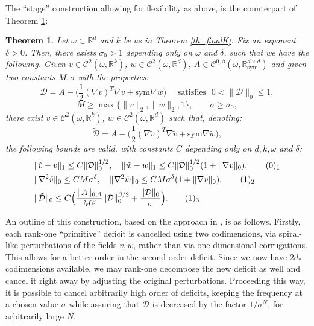 \documentclass[reqno,twoside,11pt]{amsart}
\newcommand{\sym}{\mathrm{sym}}
\newcommand{\R}{\mathbb{R}}
\numberwithin{equation}{section}
\theoremstyle{plain}
\newtheorem{theorem}{Theorem}[section]
\theoremstyle{definition}
\begin{document}
\noindent The ``stage'' construction allowing for flexibility as
above, is the counterpart of Theorem \ref{thm_stageK}:

\begin{theorem}\label{thm_stageK}
Let $\omega\subset\R^d$ and $k$ be as in Theorem \ref{th_finalK}. Fix an exponent $\delta>0$. Then,
there exists $\sigma_0>1$ depending only on $\omega$ and $\delta$,
such that we have the following. Given $v\in\mathcal{C}^2(\bar \omega,\R^k)$,
$w\in\mathcal{C}^2(\bar\omega,\R^d)$, 
$A\in\mathcal{C}^{0,\beta}(\bar\omega,\R^{d\times d}_\sym)$ and given
two constants $M, \sigma$ with the properties:
$$\mathcal{D}=A -\big(\frac{1}{2}(\nabla v)^T\nabla v + \sym\nabla
w\big) \quad \mbox{ satisfies } \; 0<\|\mathcal{D}\|_0\leq 1,$$
$$M\geq\max\{\|v\|_2, \|w\|_2, 1\}, \qquad \sigma\geq \sigma_0,$$
there exist $\tilde v\in\mathcal{C}^2(\bar \omega,\R^k)$,
$\tilde w\in\mathcal{C}^2(\bar\omega,\R^d)$ such that, denoting:
$$\tilde{\mathcal{D}}=A -\big(\frac{1}{2}(\nabla \tilde v)^T\nabla \tilde v + \sym\nabla \tilde w\big), $$
the following bounds are valid,  with constants $C$ depending only on
$d,k, \omega$ and $\delta$:
\begin{align*}
& \|\tilde v - v\|_1\leq C\|\mathcal{D}\|_0^{1/2}, \quad \|\tilde w -
w\|_1\leq C\|\mathcal{D}\|_0^{1/2}(1+\|\nabla v\|_0), \vspace{2mm}
\tag*{(\theequation)$_1$}\refstepcounter{equation} \label{Abound1K}\\
& \|\nabla^2\tilde v\|_0\leq CM\sigma^{\delta},\quad \|\nabla^2\tilde
w\|_0\leq CM\sigma^{\delta}(1+\|\nabla v\|_0), \vspace{2mm}
\tag*{(\theequation)$_2$}\label{Abound2K} \\ 
& \|\tilde{\mathcal{D}}\|_0\leq C\Big(\frac{\|A\|_{0,\beta}}{M^\beta} \|\mathcal{D}\|_0^{\beta/2} +
\frac{\|\mathcal{D}\|_0}{\sigma}\Big). \tag*{(\theequation)$_3$} \label{Abound3K}
\end{align*}
\end{theorem}

\medskip

\noindent An outline of this construction, based on the approach in \cite{Kallen}, is as follows. Firstly,
each rank-one ``primitive'' deficit is cancelled using two
codimensions, via spiral-like perturbations of the fields $v,w$,
rather than via one-dimensional corrugations. This allows for
a better order in the second order deficit. Since we
now have $2d_*$ codimensions available, we may rank-one decompose
the new deficit as well and cancel it right away by adjusting the original
perturbations. Proceeding this way, it is possible to cancel arbitrarily
high order of deficits, keeping the frequency at a chosen value $\sigma$ while
assuring that $\mathcal{D}$ is decreased by the
factor $1/\sigma^N$, for arbitrarily large $N$.
\end{document}
